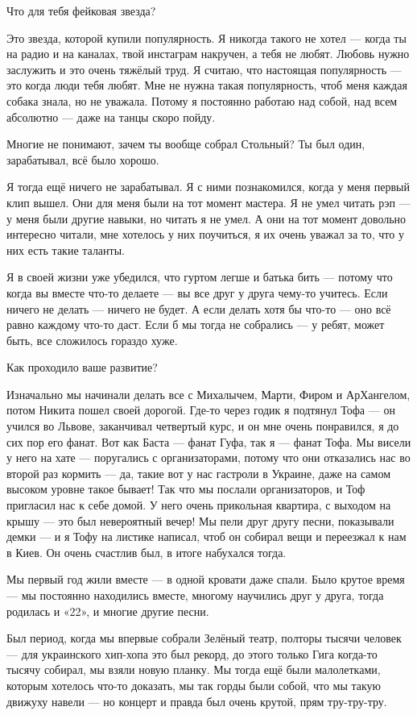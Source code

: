 Что для тебя фейковая звезда?

Это звезда, которой купили популярность. Я никогда такого не хотел --- когда ты на радио и на каналах, твой инстаграм накручен, а тебя не любят. Любовь нужно заслужить и это очень тяжёлый труд. Я считаю, что настоящая популярность --- это когда люди тебя любят. Мне не нужна такая популярность, чтоб меня каждая собака знала, но не уважала. Потому я постоянно работаю над собой, над всем абсолютно --- даже на танцы скоро пойду.

Многие не понимают, зачем ты вообще собрал Стольный? Ты был один, зарабатывал, всё было хорошо.

Я тогда ещё ничего не зарабатывал. Я с ними познакомился, когда у меня первый клип вышел. Они для меня были на тот момент мастера. Я не умел читать рэп --- у меня были другие навыки, но читать я не умел. А они на тот момент довольно интересно читали, мне хотелось у них поучиться, я их очень уважал за то, что у них есть такие таланты.

Я в своей жизни уже убедился, что гуртом легше и батька бить --- потому что когда вы вместе что-то делаете --- вы все друг у друга чему-то учитесь. Если ничего не делать --- ничего не будет. А если делать хотя бы что-то --- оно всё равно каждому что-то даст. Если б мы тогда не собрались --- у ребят, может быть, все сложилось гораздо хуже.

Как проходило ваше развитие?

Изначально мы начинали делать все с Михалычем, Марти, Фиром и АрХангелом, потом Никита пошел своей дорогой. Где-то через годик я подтянул Тофа --- он учился во Львове, заканчивал четвертый курс, и он мне очень понравился, я до сих пор его фанат. Вот как Баста --- фанат Гуфа, так я --- фанат Тофа. Мы висели у него на хате --- поругались с организаторами, потому что они отказались нас во второй раз кормить --- да, такие вот у нас гастроли в Украине, даже на самом высоком уровне такое бывает! Так что мы послали организаторов, и Тоф пригласил нас к себе домой. У него очень прикольная квартира, с выходом на крышу --- это был невероятный вечер! Мы пели друг другу песни, показывали демки --- и я Тофу на листике написал, чтоб он собирал вещи и переезжал к нам в Киев. Он очень счастлив был, в итоге набухался тогда.

Мы первый год жили вместе --- в одной кровати даже спали. Было крутое время --- мы постоянно находились вместе, многому научились друг у друга, тогда родилась и «22», и многие другие песни.

Был период, когда мы впервые собрали Зелёный театр, полторы тысячи человек --- для украинского хип-хопа это был рекорд, до этого только Гига когда-то тысячу собирал, мы взяли новую планку. Мы тогда ещё были малолетками, которым хотелось что-то доказать, мы так горды были собой, что мы такую движуху навели --- но концерт и правда был очень крутой, прям тру-тру-тру.

